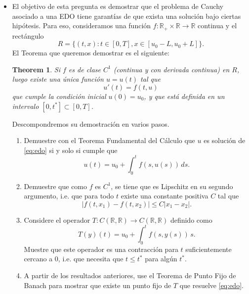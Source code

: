 \documentclass[9pt]{article}
\newcommand{\R}{\mathbb{R}}
\newtheorem{theorem}{Theorem}
\begin{document}
\begin{itemize}
    \item El objetivo de esta pregunta es demostrar que el problema de Cauchy asociado a una EDO tiene garantías de que exista una solución bajo ciertas hipótesis. Para eso, consideramos una función $f:\R_+ \times \R \to \R$ continua y el rectángulo
        $$ R = \{(t,x): t \in [0,T], x \in [u_0-L, u_0+L] \}. $$
        El Teorema que queremos demostrar es el siguiente: 
        \begin{theorem}
            Si $f$ es de clase $C^1$ (continua y con derivada continua) en $R$, luego existe una única función $u=u(t)$ tal que 
            \begin{equation}\label{eq:edo}
                u'(t) = f(t, u) 
            \end{equation}
            que cumple la condición inicial $u(0)=u_0$, y que está definida en un intervalo $[0,t^*]\subset [0,T]$. 
        \end{theorem}
        Descompondremos su demostración en varios pasos. 
        \begin{enumerate}
            \item{} Demuestre con el Teorema Fundamental del Cálculo que $u$ es solución de \eqref{eq:edo} si y solo si cumple que
                $$ u(t) = u_0 + \int_0^t f(s, u(s))\,ds. $$
            \item{} Demuestre que como $f$ es $C^1$, se tiene que es Lipschitz en su segundo argumento, i.e. que para todo $t$ existe una constante positiva $C$ tal que 
                    $$ |f(t, x_1) - f(t, x_2)|\leq C |x_1 - x_2|. $$
            \item{} Considere el operador $T:C(\R,\R)\to C(\R,\R)$ definido como
                        $$ T(y)(t) = u_0 + \int_0^t f(s, y(s))\,s. $$
                    Muestre que este operador es una contracción para $t$ suficientemente cercano a $0$, i.e. que necesita que $t\leq t^*$ para algún $t^*$. 
            \item{} A partir de los resultados anteriores, use el Teorema de Punto Fijo de Banach para mostrar que existe un punto fijo de $T$ que resuelve \eqref{eq:edo}. 
        \end{enumerate}
\end{itemize} %
\end{document}
